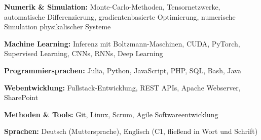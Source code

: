 \begin{skillslist}
    \item \textbf{Numerik \& Simulation:} 
    Monte-Carlo-Methoden, Tensornetzwerke, automatische Differenzierung, gradientenbasierte Optimierung, numerische Simulation physikalischer Systeme
    \item \textbf{Machine Learning:} 
    Inferenz mit Boltzmann-Maschinen, CUDA, PyTorch, Supervised Learning, CNNs, RNNs, Deep Learning
    \item \textbf{Programmiersprachen:} Julia, Python, JavaScript, PHP, SQL, Bash, Java
    \item \textbf{Webentwicklung:} Fullstack-Entwicklung, REST APIs, Apache Webserver, SharePoint
    \item \textbf{Methoden \& Tools:} Git, Linux, Scrum, Agile Softwareentwicklung
    \item \textbf{Sprachen:} Deutsch (Muttersprache), Englisch (C1, fließend in Wort und Schrift)
\end{skillslist}